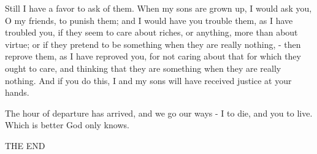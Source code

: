 Still I have a favor to ask of them. When my sons are grown up, I
would ask you, O my friends, to punish them; and I would have you
trouble them, as I have troubled you, if they seem to care about riches,
or anything, more than about virtue; or if they pretend to be something
when they are really nothing, - then reprove them, as I have reproved
you, for not caring about that for which they ought to care, and thinking
that they are something when they are really nothing. And if you do
this, I and my sons will have received justice at your hands.

The hour of departure has arrived, and we go our ways - I to die,
and you to live. Which is better God only knows. 

THE END

